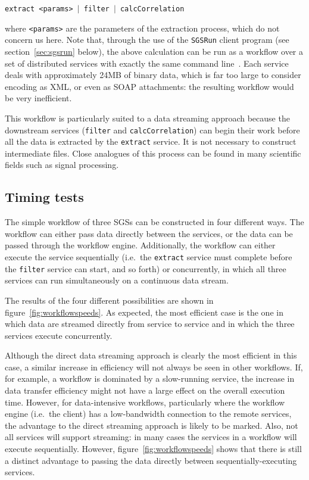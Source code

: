 \documentclass[a4paper]{article}
\begin{document}
\texttt{extract <params> $|$ filter $|$ calcCorrelation}

\noindent where \texttt{<params>} are the parameters of the extraction process, which do not concern us here.  Note that, through the use of the \texttt{SGSRun} client program (see section~\ref{sec:sgsrun} below), the above calculation can be run as a workflow over a set of distributed services with exactly the same command line~\cite{blower_lncs:2006}.  Each service deals with approximately 24MB of binary data, which is far too large to consider encoding as XML, or even as SOAP attachments: the resulting workflow would be very inefficient.

This workflow is particularly suited to a data streaming approach because the downstream services (\texttt{filter} and \texttt{calcCorrelation}) can begin their work before all the data is extracted by the \texttt{extract} service.  It is not necessary to construct intermediate files.  Close analogues of this process can be found in many scientific fields such as signal processing.

\subsection{Timing tests}
The simple workflow of three SGSs can be constructed in four different ways.  The workflow can either pass data directly between the services, or the data can be passed through the workflow engine.  Additionally, the workflow can either execute the service sequentially (i.e.\ the \texttt{extract} service must complete before the \texttt{filter} service can start, and so forth) or concurrently, in which all three services can run simultaneously on a continuous data stream.

The results of the four different possibilities are shown in figure~\ref{fig:workflowspeeds}.  As expected, the most efficient case is the one in which data are streamed directly from service to service and in which the three services execute concurrently.

Although the direct data streaming approach is clearly the most efficient in this case, a similar increase in efficiency will not always be seen in other workflows.  If, for example, a workflow is dominated by a slow-running service, the increase in data transfer efficiency might not have a large effect on the overall execution time.  However, for data-intensive workflows, particularly where the workflow engine (i.e.\ the client) has a low-bandwidth connection to the remote services, the advantage to the direct streaming approach is likely to be marked.  Also, not all services will support streaming: in many cases the services in a workflow will execute sequentially.  However, figure~\ref{fig:workflowspeeds} shows that there is still a distinct advantage to passing the data directly between sequentially-executing services.
\end{document}
